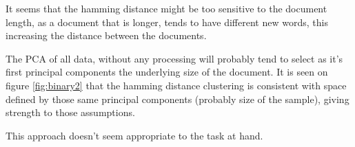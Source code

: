 \documentclass[a4paper,10pt]{article}
\begin{document}
It seems that the hamming distance might be too sensitive to the document length, as a document that is longer, tends to have different new words, this increasing the distance between the documents. 

The PCA of all data, without any processing will probably tend to select as it's first principal components the underlying size of the document. It is seen on figure \ref{fig:binary2} that the hamming distance clustering is consistent with space defined by those same principal components (probably size of the sample), giving strength to those assumptions.

This approach doesn't seem appropriate to the task at hand.
\end{document}
